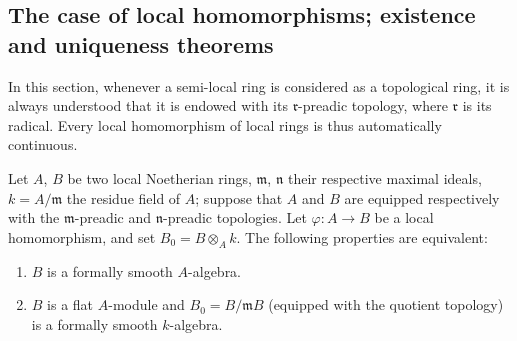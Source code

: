\subsection{The case of local homomorphisms; existence and uniqueness theorems}
\label{subsection:0.19.7}

In this section, whenever a semi-local ring is considered as a topological ring, it is always understood that it is endowed with its $\mathfrak{r}$-preadic topology, where $\mathfrak{r}$ is its radical. Every local homomorphism of local rings is thus automatically continuous.

\begin{theorem}[19.7.1]
\label{0.19.7.1}
Let $A$, $B$ be two local Noetherian rings, $\mathfrak{m}$, $\mathfrak{n}$ their respective maximal ideals, $k=A/\mathfrak{m}$ the residue field of $A$; suppose that $A$ and $B$ are equipped respectively with the $\mathfrak{m}$-preadic and $\mathfrak{n}$-preadic topologies.
Let $\varphi:A\to B$ be a local homomorphism, and set $B_0=B\otimes_A k$.
The following properties are equivalent:
\begin{enumerate}
  \item[\rm a)] $B$ is a formally smooth $A$-algebra.
  \item[\rm b)] $B$ is a flat $A$-module and $B_0=B/\mathfrak{m}B$ (equipped with the quotient topology) is a formally smooth $k$-algebra.
\end{enumerate}
\end{theorem}

